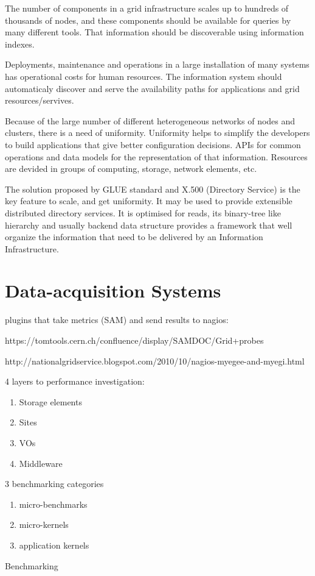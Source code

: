 The number of components in a grid infrastructure scales up to hundreds of thousands of nodes, and these components should be available for queries by many different tools. That information should be discoverable using information indexes.

Deployments, maintenance and operations in a large installation of many systems has operational costs for human resources. The information system should automaticaly discover and serve the availability paths for applications and grid resources/servives.

Because of the large number of different heterogeneous networks of nodes and clusters, there is a need of uniformity. Uniformity helps to simplify the developers to build applications that give better configuration decisions. APIs for common operations and data models for the representation of that information. Resources are devided in groups of computing, storage, network elements, etc.

The solution proposed by GLUE standard and X.500 (Directory Service) is the key feature to scale, and get uniformity. It may be used to provide extensible distributed directory services. It is optimised for reads, its binary-tree like hierarchy and usually backend data structure provides a framework that well organize the information that need to be delivered by an Information Infrastructure.\cite{mds1}

\section{Data-acquisition Systems}
plugins that take metrics (SAM) and send results to nagios:

https://tomtools.cern.ch/confluence/display/SAMDOC/Grid+probes

http://nationalgridservice.blogspot.com/2010/10/nagios-myegee-and-myegi.html

4 layers to performance investigation:
\begin{enumerate}
  \item Storage elements
  \item Sites
  \item VOs
  \item Middleware
\end{enumerate}
3 benchmarking categories
\begin{enumerate}
  \item micro-benchmarks
  \item micro-kernels
  \item application kernels
\end{enumerate}
Benchmarking

